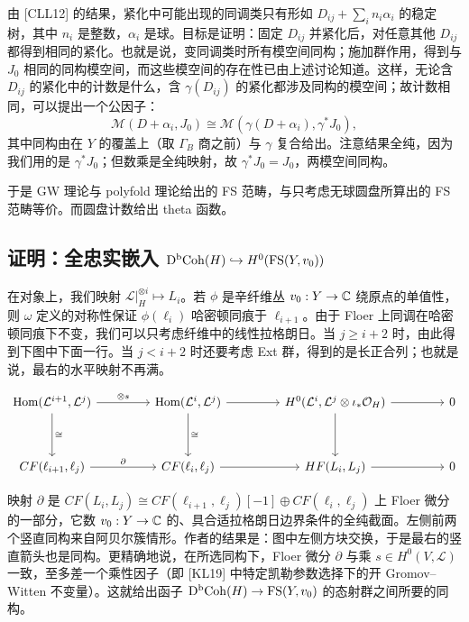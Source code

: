 由 [CLL12] 的结果，紧化中可能出现的同调类只有形如 $D_{ij}+\sum_i n_i\alpha_i$ 的稳定树，其中 $n_i$ 是整数，$\alpha_i$ 是球。目标是证明：固定 $D_{ij}$ 并紧化后，对任意其他 $D_{ij}$ 都得到相同的紧化。也就是说，变同调类时所有模空间同构；施加群作用，得到与 $J_0$ 相同的同构模空间，而这些模空间的存在性已由上述讨论知道。这样，无论含 $D_{ij}$ 的紧化中的计数是什么，含 $\gamma(D_{ij})$ 的紧化都涉及同构的模空间；故计数相同，可以提出一个公因子：
\[
\mathcal{M}(D+\alpha_i,J_0)\cong\mathcal{M}(\gamma(D+\alpha_i),\gamma^*J_0),
\]
其中同构由在 $Y$ 的覆盖上（取 $\Gamma_B$ 商之前）与 $\gamma$ 复合给出。注意结果全纯，因为我们用的是 $\gamma^*J_0$；但数乘是全纯映射，故 $\gamma^*J_0=J_0$，两模空间同构。

于是 GW 理论与 polyfold 理论给出的 FS 范畴，与只考虑无球圆盘所算出的 FS 范畴等价。而圆盘计数给出 theta 函数。


\subsection{证明：全忠实嵌入 $\mathrm{D}^{\mathrm{b}}\mathrm{Coh}(H)\hookrightarrow H^0(\mathrm{FS}(Y,v_0))$}

在对象上，我们映射 $\mathcal{L}|_H^{\otimes i}\mapsto L_i$。若 $\phi$ 是辛纤维丛 $v_0:Y\to\mathbb{C}$ 绕原点的单值性，则 $\omega$ 定义的对称性保证 $\phi(\ell_i)$ 哈密顿同痕于 $\ell_{i+1}$。由于 Floer 上同调在哈密顿同痕下不变，我们可以只考虑纤维中的线性拉格朗日。当 $j\ge i+2$ 时，由此得到下图中下面一行。当 $j<i+2$ 时还要考虑 Ext 群，得到的是长正合列；也就是说，最右的水平映射不再满。

\[
\begin{tikzcd}[column sep=4.4em, row sep=3.6em]
\Hom(\mathcal{L}^{i+1},\mathcal{L}^j)
  \arrow[r,"\otimes s"] \arrow[d,"\cong"] &
\Hom(\mathcal{L}^{i},\mathcal{L}^j)
  \arrow[r] \arrow[d,"\cong"] &
H^0(\mathcal{L}^{i},\mathcal{L}^j\otimes\iota_*\mathcal{O}_H)
  \arrow[r] \arrow[d] & 0\\
CF(\ell_{i+1},\ell_j)
  \arrow[r,"\partial"] &
CF(\ell_i,\ell_j)
  \arrow[r] &
HF(L_i,L_j)
  \arrow[r] & 0
\end{tikzcd}
\]

映射 $\partial$ 是 $CF(L_i,L_j)\cong CF(\ell_{i+1},\ell_j)[-1]\oplus CF(\ell_i,\ell_j)$ 上 Floer 微分的一部分，它数 $v_0:Y\to\mathbb{C}$ 的、具合适拉格朗日边界条件的全纯截面。左侧前两个竖直同构来自阿贝尔簇情形。作者的结果是：图中左侧方块交换，于是最右的竖直箭头也是同构。更精确地说，在所选同构下，Floer 微分 $\partial$ 与乘 $s\in H^0(V,\mathcal{L})$ 一致，至多差一个乘性因子（即 [KL19] 中特定凯勒参数选择下的开 Gromov--Witten 不变量）。这就给出函子 $\mathrm{D}^{\mathrm{b}}\mathrm{Coh}(H)\to\mathrm{FS}(Y,v_0)$ 的态射群之间所要的同构。

